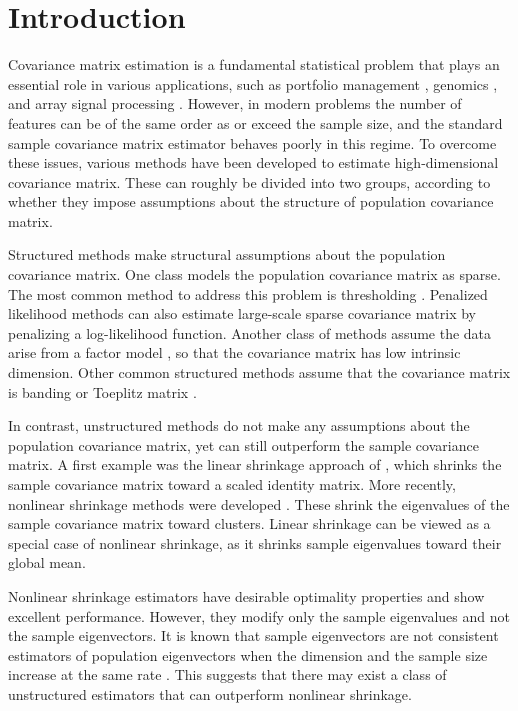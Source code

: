 \section{Introduction}
\label{introduction}

Covariance matrix estimation is a fundamental statistical problem that plays an essential role in various applications, such as portfolio management \citep{ledoit2003improved}, genomics \citep{schafer2005shrinkage}, and array signal processing \citep{abramovich2001locally}. However, in modern problems the number of features can be of the same order as or exceed the sample size, and the standard sample covariance matrix estimator behaves poorly in this regime. To overcome these issues, various methods have been developed to estimate high-dimensional covariance matrix. These can roughly be divided into two groups, according to whether they impose assumptions about the structure of population covariance matrix.

Structured methods make structural assumptions about the population covariance matrix. One class models the population covariance matrix as sparse. The most common method to address this problem is thresholding \citep{rothman2009generalized, cai2011adaptive}. Penalized likelihood methods \citep{xue2012positive} can also estimate large-scale sparse covariance matrix by penalizing a log-likelihood function. Another class of methods assume the data arise from a factor model \citep{fan2008high}, so that the covariance matrix has low intrinsic dimension. Other common structured methods assume that the covariance matrix is banding \citep{li2017estimation} or Toeplitz matrix \citep{liu2017covariance}. 

In contrast, unstructured methods do not make any assumptions about the population covariance matrix, yet can still outperform the sample covariance matrix. A first example was the linear shrinkage approach of \citet{ledoit2004well}, which shrinks the sample covariance matrix toward a scaled identity matrix. More recently, nonlinear shrinkage methods were developed \citep{ledoit2012nonlinear, ledoit2019quadratic, lam2016nonparametric}. These shrink the eigenvalues of the sample covariance matrix toward clusters. Linear shrinkage can be viewed as a special case of nonlinear shrinkage, as it shrinks sample eigenvalues toward their global mean.

Nonlinear shrinkage estimators have desirable optimality properties \citep{ledoit2018analytical} and show excellent performance. However, they modify only the sample eigenvalues and not the sample eigenvectors. It is known that sample eigenvectors are not consistent estimators of population eigenvectors when the dimension and the sample size increase at the same rate \citep{mestre2008asymptotic}. This suggests that there may exist a class of unstructured estimators that can outperform nonlinear shrinkage.

